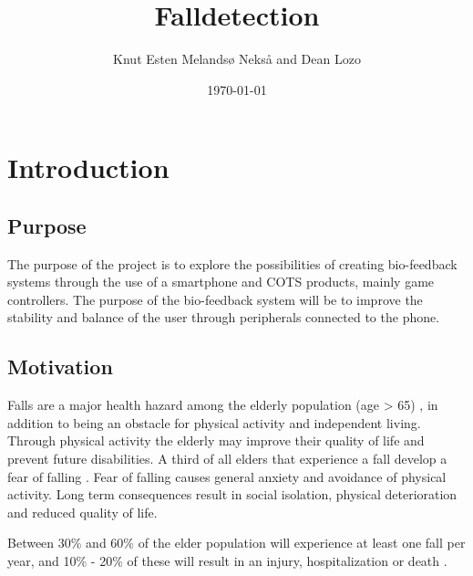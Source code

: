 \documentclass[11pt,twoside,a4paper]{report}
\begin{document}
\title{Falldetection}
\author{Knut Esten Melandsø Nekså and Dean Lozo}
\date{\today}
\maketitle


\begin{abstract}

\end{abstract}

\tableofcontents

\chapter{Introduction}

\section{Purpose}
The purpose of the project is to explore the possibilities of creating bio-feedback systems through the use of a smartphone and COTS products, mainly game controllers. The purpose of the bio-feedback system will be to improve the stability and balance of the user through peripherals connected to the phone.

\section{Motivation}
Falls are a major health hazard among the elderly population (age > 65) \cite{falls_health_hazard}, in addition to being an obstacle for physical activity and independent living. Through physical activity the elderly may improve their quality of life and prevent future disabilities\cite{physical_activity}. A third of all elders that experience a fall develop a fear of falling \cite{fear_of_falling}. Fear of falling causes general anxiety and avoidance of physical activity. Long term consequences result in social isolation, physical deterioration and reduced quality of life.\cite{physical_avoidance} %

Between 30\% and 60\% of the elder population will experience at least one fall per year, and 10\% - 20\% of these will result in an injury, hospitalization or death \cite{fall_statistics}. 
\end{document}

